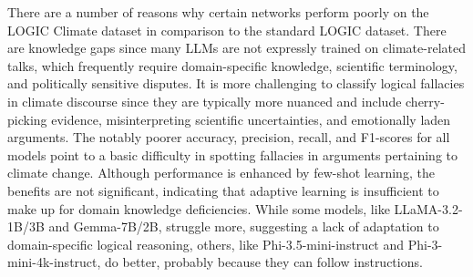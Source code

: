 \documentclass[runningheads]{llncs}
\begin{document}
There are a number of reasons why certain networks perform poorly on the LOGIC Climate dataset in comparison to the standard LOGIC dataset. There are knowledge gaps since many LLMs are not expressly trained on climate-related talks, which frequently require domain-specific knowledge, scientific terminology, and politically sensitive disputes. It is more challenging to classify logical fallacies in climate discourse since they are typically more nuanced and include cherry-picking evidence, misinterpreting scientific uncertainties, and emotionally laden arguments. The notably poorer accuracy, precision, recall, and F1-scores for all models point to a basic difficulty in spotting fallacies in arguments pertaining to climate change. Although performance is enhanced by few-shot learning, the benefits are not significant, indicating that adaptive learning is insufficient to make up for domain knowledge deficiencies. While some models, like LLaMA-3.2-1B/3B and Gemma-7B/2B, struggle more, suggesting a lack of adaptation to domain-specific logical reasoning, others, like Phi-3.5-mini-instruct and Phi-3-mini-4k-instruct, do better, probably because they can follow instructions.

\end{document}
